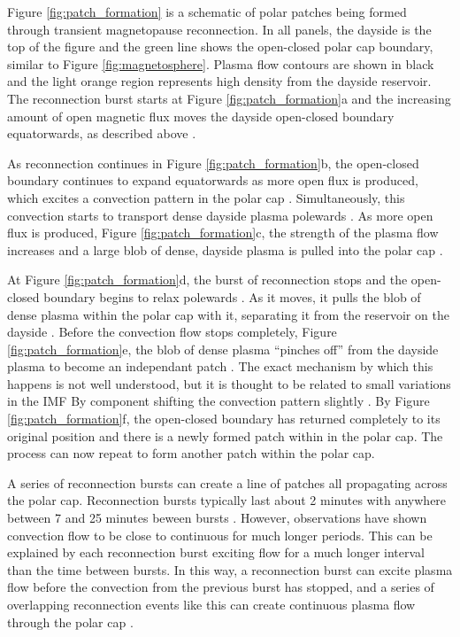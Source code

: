Figure \ref{fig:patch_formation} is a schematic of polar patches being formed through transient magnetopause reconnection.  In all panels, the dayside is the top of the figure and the green line shows the open-closed polar cap boundary, similar to Figure \ref{fig:magnetosphere}.  Plasma flow contours are shown in black and the light orange region represents high density from the dayside reservoir.  The reconnection burst starts at Figure \ref{fig:patch_formation}a and the increasing amount of open magnetic flux moves the dayside open-closed boundary equatorwards, as described above \citep{Cowley1991}.

As reconnection continues in Figure \ref{fig:patch_formation}b, the open-closed boundary continues to expand equatorwards as more open flux is produced, which excites a convection pattern in the polar cap \citep{Cowley1991}.  Simultaneously, this convection starts to transport dense dayside plasma polewards \citep{Lockwood1992b}.  As more open flux is produced, Figure \ref{fig:patch_formation}c, the strength of the plasma flow increases and a large blob of dense, dayside plasma is pulled into the polar cap \citep{Lockwood1992b}.

At Figure \ref{fig:patch_formation}d, the burst of reconnection stops and the open-closed boundary begins to relax polewards \citep{Cowley1991}.  As it moves, it pulls the blob of dense plasma within the polar cap with it, separating it from the reservoir on the dayside \citep{Lockwood1992b}.  Before the convection flow stops completely, Figure \ref{fig:patch_formation}e, the blob of dense plasma ``pinches off'' from the dayside plasma to become an independant patch \citep{Lockwood1992b}.  The exact mechanism by which this happens is not well understood, but it is thought to be related to small variations in the IMF By component shifting the convection pattern slightly \citep{Cowley1980,Lockwood1992b}.  By Figure \ref{fig:patch_formation}f, the open-closed boundary has returned completely to its original position and there is a newly formed patch within in the polar cap.  The process can now repeat to form another patch within the polar cap.

A series of reconnection bursts can create a line of patches all propagating across the polar cap.  Reconnection bursts typically last about 2 minutes with anywhere between 7 and 25 minutes beween bursts \citep{Foster1984,Etemadi1988,Lockwood1992b}.  However, observations have shown convection flow to be close to continuous for much longer periods.  This can be explained by each reconnection burst exciting flow for a much longer interval than the time between bursts.  In this way, a reconnection burst can excite plasma flow before the convection from the previous burst has stopped, and a series of overlapping reconnection events like this can create continuous plasma flow through the polar cap \citep{Cowley1991}. 


